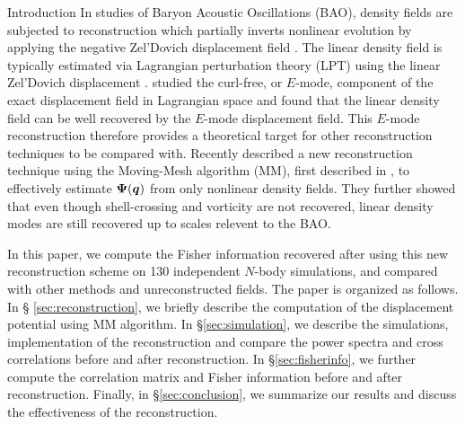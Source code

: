 \begin{section}{Introduction}
  In studies of Baryon Acoustic Oscillations (BAO), density fields are
  subjected to reconstruction which partially inverts nonlinear
  evolution by applying the negative Zel'Dovich displacement field \cite{bib:Eisenstein2007}.
  The linear density field is
  typically estimated via Lagrangian perturbation theory (LPT)
  using the linear Zel'Dovich displacement \cite{bib:Zel1970}.
  \citet{bib:Yu2016} studied the curl-free, or $E$-mode, component of 
  the exact displacement field in Lagrangian
  space and found that the linear density field can be well recovered by
  the $E$-mode displacement field.
  This $E$-mode reconstruction therefore provides a theoretical 
  target for other reconstruction techniques to be compared with.
  Recently \citet{bib:Zhu2016,bib:ZhuH2016} described a new reconstruction 
  technique using the Moving-Mesh
  algorithm (MM), first described in \cite{bib:Pen1995,bib:Pen1998},
  to effectively estimate $\boldsymbol{\Psi}(\boldsymbol{q})$ from only nonlinear
  density fields.  They further showed that even though shell-crossing
  and vorticity are not recovered, linear density modes are still 
  recovered up to scales relevent to the BAO.

  In this paper, we compute the Fisher information recovered after
  using this new reconstruction scheme on 130 independent $N$-body
  simulations, and compared with other methods and unreconstructed
  fields.  The paper is organized as follows.  In \S
  \ref{sec:reconstruction}, we briefly
  describe the computation of the displacement potential using MM
  algorithm. In \S \ref{sec:simulation}, we describe  
  the simulations, implementation of the reconstruction and compare 
  the power spectra and cross correlations before and after reconstruction.  
  In \S \ref{sec:fisherinfo}, we further compute the correlation matrix 
  and Fisher information before and
  after reconstruction.  Finally, in \S \ref{sec:conclusion}, we summarize 
  our results and 
  discuss the effectiveness of the reconstruction.


\end{section}

